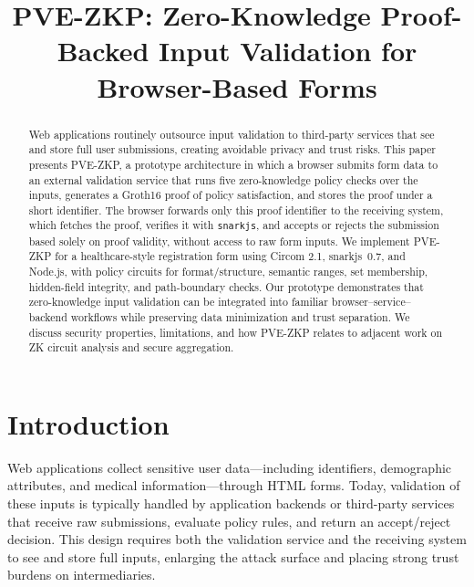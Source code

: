 \documentclass[conference]{IEEEtran}
\begin{document}
\title{PVE-ZKP: Zero-Knowledge Proof-Backed Input Validation for Browser-Based Forms}

\author{
}

\maketitle

\begin{abstract}
Web applications routinely outsource input validation to third-party services that
see and store full user submissions, creating avoidable privacy and trust risks.
This paper presents PVE-ZKP, a prototype architecture in which a browser submits
form data to an external validation service that runs five zero-knowledge
policy checks over the inputs, generates a Groth16 proof of policy satisfaction,
and stores the proof under a short identifier. The browser forwards only this
proof identifier to the receiving system, which fetches the proof, verifies it
with \texttt{snarkjs}, and accepts or rejects the submission based solely on
proof validity, without access to raw form inputs. We implement PVE-ZKP for a
healthcare-style registration form using Circom 2.1, snarkjs~0.7, and Node.js,
with policy circuits for format/structure, semantic ranges, set membership,
hidden-field integrity, and path-boundary checks. Our prototype demonstrates
that zero-knowledge input validation can be integrated into familiar
browser--service--backend workflows while preserving data minimization and
trust separation. We discuss security properties, limitations, and how PVE-ZKP
relates to adjacent work on ZK circuit analysis and secure aggregation.
\end{abstract}

\section{Introduction}

Web applications collect sensitive user data---including identifiers, demographic
attributes, and medical information---through HTML forms. Today, validation of
these inputs is typically handled by application backends or third-party
services that receive raw submissions, evaluate policy rules, and return an
accept/reject decision. This design requires both the validation service and the
receiving system to see and store full inputs, enlarging the attack surface and
placing strong trust burdens on intermediaries.
\end{document}
